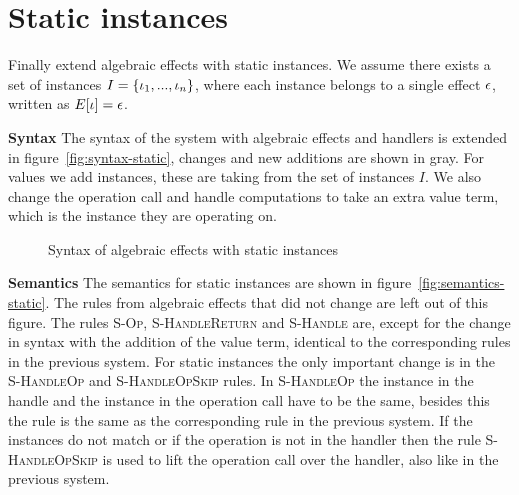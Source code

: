 {\newpage
\section{Static instances} \label{section:staticinst}

Finally extend algebraic effects with static instances. We assume there exists a set of instances $I = \{ \iota_1, ..., \iota_n \}$, where each instance belongs to a single effect $\epsilon$, written as $E[\iota] = \epsilon$.

\textbf{Syntax}
The syntax of the system with algebraic effects and handlers is extended in figure~\ref{fig:syntax-static}, changes and new additions are shown in gray. For values we add instances, these are taking from the set of instances $I$. We also change the operation call and handle computations to take an extra value term, which is the instance they are operating on.

\begin{figure}
\caption{Syntax of algebraic effects with static instances}
\centering
{}
\end{figure}

\textbf{Semantics}
The semantics for static instances are shown in figure~\ref{fig:semantics-static}. The rules from algebraic effects that did not change are left out of this figure. The rules \textsc{S-Op}, \textsc{S-HandleReturn} and \textsc{S-Handle} are, except for the change in syntax with the addition of the value term, identical to the corresponding rules in the previous system. For static instances the only important change is in the \textsc{S-HandleOp} and \textsc{S-HandleOpSkip} rules. In \textsc{S-HandleOp} the instance in the handle and the instance in the operation call have to be the same, besides this the rule is the same as the corresponding rule in the previous system. If the instances do not match or if the operation is not in the handler then the rule \textsc{S-HandleOpSkip} is used to lift the operation call over the handler, also like in the previous system.

}
